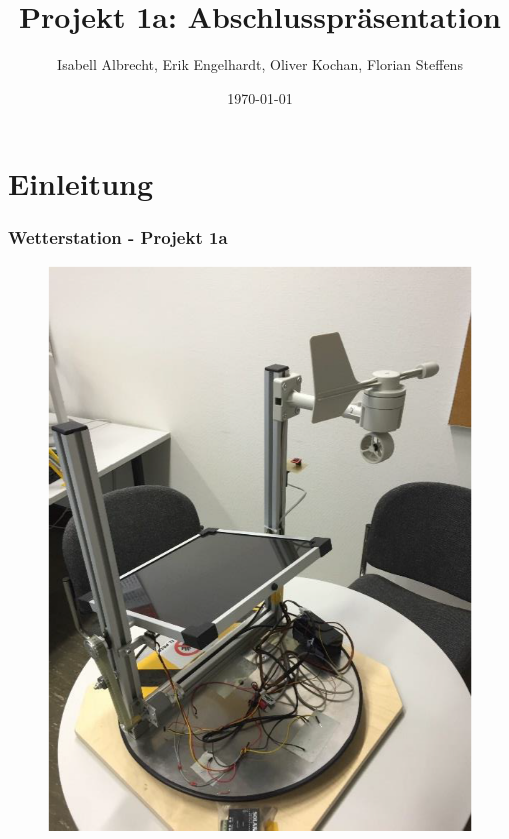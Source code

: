 \documentclass{beamer}
\title[]{Projekt 1a:
  Abschlusspräsentation} %
\author{Isabell Albrecht, Erik Engelhardt, Oliver Kochan, Florian
  Steffens} %
\institute[HAW] %
{ Hochschule für angewandte Wissenschaften -- Hamburg
  \\ %
  \medskip
}
\date{\today} %
\begin{document}
\begin{frame}
  \titlepage %
\end{frame}

\section{Einleitung}
\begin{frame}
  \frametitle{Wetterstation - Projekt 1a}
  \begin{figure}
    \centering
    \begin{minipage}[t]{0.45\linewidth}
      \centering
      \includegraphics[width=\linewidth]{img/Wetterstation_1.png}
    \end{minipage}%
    \hfill
    \begin{minipage}[t]{0.45\linewidth}
      \centering

\end{minipage}
\end{figure}
\end{frame}
\end{document}
